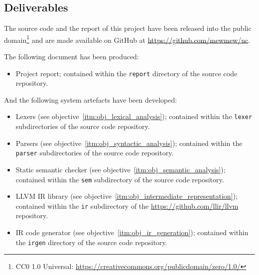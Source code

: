 
\subsection{Deliverables}
\label{sec:intro_deliverables}

The source code and the report of this project have been released into the public domain\footnote{CC0 1.0 Universal: \url{https://creativecommons.org/publicdomain/zero/1.0/}} and are made available on GitHub at \url{https://github.com/mewmew/uc}.

The following document has been produced:

\begin{itemize}
	\item Project report; contained within the \texttt{report} directory of the source code repository.
\end{itemize}

And the following system artefacts have been developed:

\begin{itemize}
	\item Lexers (see objective~\ref{itm:obj_lexical_analysis}); contained within the \texttt{lexer} subdirectories of the source code repository.
	\item Parsers (see objective~\ref{itm:obj_syntactic_analysis}); contained within the \texttt{parser} subdirectories of the source code repository.
	\item Static semantic checker (see objective~\ref{itm:obj_semantic_analysis}); contained within the \texttt{sem} subdirectory of the source code repository.
	\item LLVM IR library (see objective~\ref{itm:obj_intermediate_representation}); contained within the \texttt{ir} subdirectory of the \url{https://github.com/llir/llvm} repository.
	\item IR code generator (see objective~\ref{itm:obj_ir_generation}); contained within the \texttt{irgen} directory of the source code repository.
\end{itemize}
